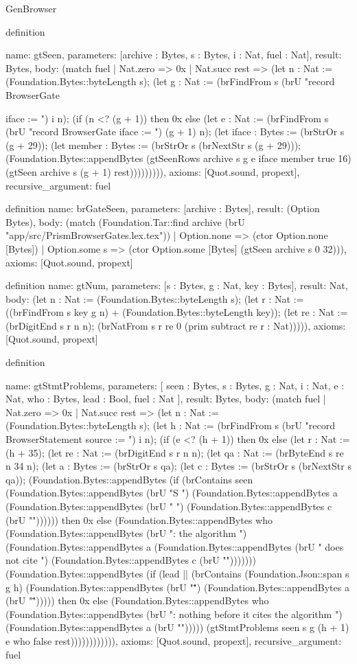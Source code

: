 \begin{lexlean}{GenBrowser}
\begin{semanticmodule}
{{{{{definition{
  name: gtSeen,
  parameters: [archive : Bytes, s : Bytes, i : Nat, fuel : Nat],
  result: Bytes,
  body: (match fuel
    | Nat.zero => 0x
    | Nat.succ rest => (let n : Nat := (Foundation.Bytes::byteLength s); (let g : Nat := (brFindFrom s (brU "record BrowserGate {iface := ") i n); (if (n <? (g + 1)) then 0x else (let e : Nat := (brFindFrom s (brU "record BrowserGate {iface := ") (g + 1) n); (let iface : Bytes := (brStrOr s (g + 29)); (let member : Bytes := (brStrOr s (brNextStr s (g + 29))); (Foundation.Bytes::appendBytes (gtSeenRows archive s g e iface member true 16) (gtSeen archive s (g + 1) rest))))))))),
  axioms: [Quot.sound, propext],
  recursive_argument: fuel
}

definition{
  name: brGateSeen,
  parameters: [archive : Bytes],
  result: (Option Bytes),
  body: (match (Foundation.Tar::find archive (brU "app/src/PrismBrowserGates.lex.tex"))
    | Option.none => (ctor Option.none [Bytes])
    | Option.some s => (ctor Option.some [Bytes] (gtSeen archive s 0 32))),
  axioms: [Quot.sound, propext]
}

definition{
  name: gtNum,
  parameters: [s : Bytes, g : Nat, key : Bytes],
  result: Nat,
  body: (let n : Nat := (Foundation.Bytes::byteLength s); (let r : Nat := ((brFindFrom s key g n) + (Foundation.Bytes::byteLength key)); (let re : Nat := (brDigitEnd s r n n); (brNatFrom s r re 0 (prim subtract re r : Nat))))),
  axioms: [Quot.sound, propext]
}

definition{
  name: gtStmtProblems,
  parameters: [
    seen : Bytes,
    s : Bytes,
    g : Nat,
    i : Nat,
    e : Nat,
    who : Bytes,
    lead : Bool,
    fuel : Nat
  ],
  result: Bytes,
  body: (match fuel
    | Nat.zero => 0x
    | Nat.succ rest => (let n : Nat := (Foundation.Bytes::byteLength s); (let h : Nat := (brFindFrom s (brU "record BrowserStatement {source := ") i n); (if (e <? (h + 1)) then 0x else (let r : Nat := (h + 35); (let re : Nat := (brDigitEnd s r n n); (let qa : Nat := (brByteEnd s re n 34 n); (let a : Bytes := (brStrOr s qa); (let c : Bytes := (brStrOr s (brNextStr s qa)); (Foundation.Bytes::appendBytes (if (brContains seen (Foundation.Bytes::appendBytes (brU "S ") (Foundation.Bytes::appendBytes a (Foundation.Bytes::appendBytes (brU " ") (Foundation.Bytes::appendBytes c (brU "\n")))))) then 0x else (Foundation.Bytes::appendBytes who (Foundation.Bytes::appendBytes (brU ": the algorithm ") (Foundation.Bytes::appendBytes a (Foundation.Bytes::appendBytes (brU " does not cite ") (Foundation.Bytes::appendBytes c (brU "\n"))))))) (Foundation.Bytes::appendBytes (if (lead || (brContains (Foundation.Json::span s g h) (Foundation.Bytes::appendBytes (brU "\"") (Foundation.Bytes::appendBytes a (brU "\""))))) then 0x else (Foundation.Bytes::appendBytes who (Foundation.Bytes::appendBytes (brU ": nothing before it cites the algorithm ") (Foundation.Bytes::appendBytes a (brU "\n"))))) (gtStmtProblems seen s g (h + 1) e who false rest)))))))))))),
  axioms: [Quot.sound, propext],
  recursive_argument: fuel
}

}}}}}}}}
\end{semanticmodule}
\end{lexlean}
